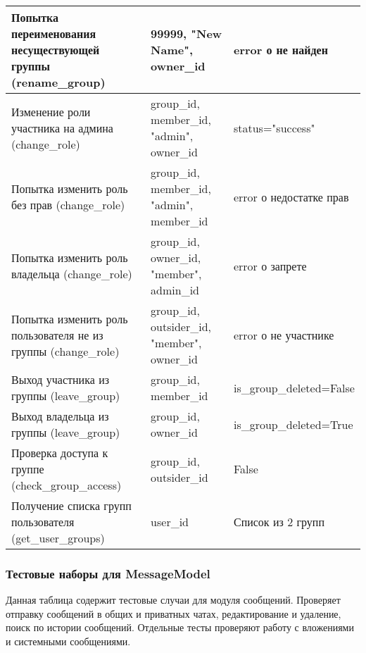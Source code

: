 \begin{xltabular}{\linewidth}{|X|X|X|}
	Попытка переименования несуществующей группы (rename\_group) & 99999, "New Name", owner\_id & error о не найден \\ \hline
	Изменение роли участника на админа (change\_role) & group\_id, member\_id, "admin", owner\_id & status="success" \\ \hline
	Попытка изменить роль без прав (change\_role) & group\_id, member\_id, "admin", member\_id & error о недостатке прав \\ \hline
	Попытка изменить роль владельца (change\_role) & group\_id, owner\_id, "member", admin\_id & error о запрете \\ \hline
	Попытка изменить роль пользователя не из группы (change\_role) & group\_id, outsider\_id, "member", owner\_id & error о не участнике \\ \hline
	Выход участника из группы (leave\_group) & group\_id, member\_id & is\_group\_deleted=False \\ \hline
	Выход владельца из группы (leave\_group) & group\_id, owner\_id & is\_group\_deleted=True \\ \hline
	Проверка доступа к группе (check\_group\_access) & group\_id, outsider\_id & False \\ \hline
	Получение списка групп пользователя (get\_user\_groups) & user\_id & Список из 2 групп \\ \hline
\end{xltabular}

\subsubsection{Тестовые наборы для MessageModel}

Данная таблица содержит тестовые случаи для модуля сообщений. Проверяет отправку сообщений в общих и приватных чатах, редактирование и удаление, поиск по истории сообщений. Отдельные тесты проверяют работу с вложениями и системными сообщениями.

